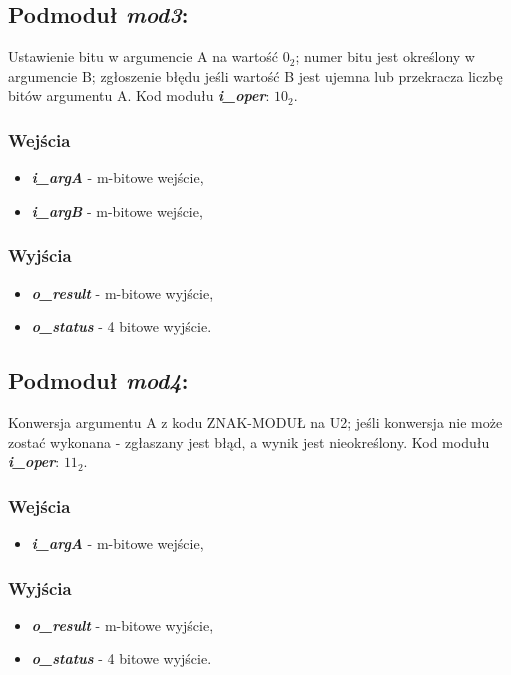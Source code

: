 \subsection{Podmoduł \emph{mod3}:}
Ustawienie bitu w argumencie A na wartość \(0_2\); numer bitu jest określony w argumencie B; zgłoszenie błędu jeśli wartość B jest ujemna lub przekracza liczbę bitów argumentu A. Kod modułu \textbf{\emph{i\_oper}}: \(10_2\).

\subsubsection*{Wejścia}
\begin{itemize}
	\item \emph{\textbf{i\_argA}} - m-bitowe wejście,
	\item \emph{\textbf{i\_argB}} - m-bitowe wejście,
\end{itemize}
\subsubsection*{Wyjścia}
\begin{itemize}
	\item \emph{\textbf{o\_result}} - m-bitowe wyjście,
	\item \emph{\textbf{o\_status}} - 4 bitowe wyjście.
\end{itemize}

\subsection{Podmoduł \emph{mod4}:}
Konwersja argumentu A z kodu ZNAK-MODUŁ na U2; jeśli konwersja nie może zostać wykonana - zgłaszany jest błąd, a wynik jest nieokreślony. Kod modułu \textbf{\emph{i\_oper}}: \(11_2\).

\subsubsection*{Wejścia}
\begin{itemize}
	\item \emph{\textbf{i\_argA}} - m-bitowe wejście,
\end{itemize}
\subsubsection*{Wyjścia}
\begin{itemize}
	\item \emph{\textbf{o\_result}} - m-bitowe wyjście,
	\item \emph{\textbf{o\_status}} - 4 bitowe wyjście.
\end{itemize}